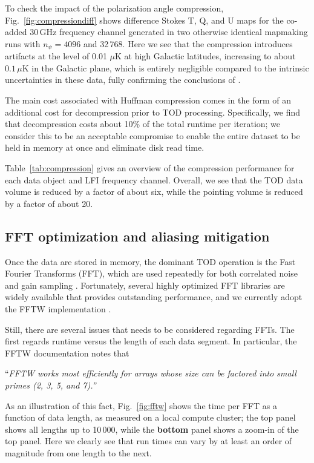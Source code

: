 \documentclass[twocolumn]{aa}
\begin{document}
To check the impact of the polarization angle compression,
Fig.~\ref{fig:compressiondiff} shows difference Stokes T, Q, and U
maps for the co-added 30\,GHz frequency channel generated in two
otherwise identical mapmaking runs with $n_{\psi}=4096$ and
32\,768. Here we see that the compression introduces artifacts at the
level of 0.01 $\mu$K at high Galactic latitudes, increasing to about
$0.1\,\mu$K in the Galactic plane, which is entirely negligible
compared to the intrinsic uncertainties in these data, fully
confirming the conclusions of \citet{keihanen2012}.

The main cost associated with Huffman compression comes in the form of
an additional cost for decompression prior to TOD
processing. Specifically, we find that decompression costs about 10\%
of the total runtime per iteration; we consider this to be an
acceptable compromise to enable the entire dataset to be held in
memory at once and eliminate disk read time.

Table~\ref{tab:compression} gives an overview of the compression
performance for each data object and LFI frequency channel. Overall,
we see that the TOD data volume is reduced by a factor of about six,
while the pointing volume is reduced by a factor of about 20. 

\subsection{FFT optimization and aliasing mitigation}

Once the data are stored in memory, the dominant TOD operation is
the Fast Fourier Transforms (FFT), which are used repeatedly for both
correlated noise and gain sampling \citep{BP06,BP07}. Fortunately,
several highly optimized FFT libraries are widely available that
provides outstanding performance, and we currently adopt the FFTW
implementation \citep{FFTW05}.

Still, there are several issues that needs to be considered regarding
FFTs. The first regards runtime versus the length of each data
segment. In particular, the FFTW documentation notes that
\begin{displayquote}
``\emph{FFTW works most efficiently for arrays whose size can be factored into small primes (2, 3, 5, and 7).''}
\end{displayquote}
As an illustration of this fact, Fig.~\ref{fig:fftw} shows the time
per FFT as a function of data length, as measured on a local compute
cluster; the top panel shows all lengths up to 10\,000, while the
\textbf{bottom} panel shows a zoom-in of the top panel. Here we clearly see
that run times can vary by at least an order of magnitude from one
length to the next.
\end{document}
